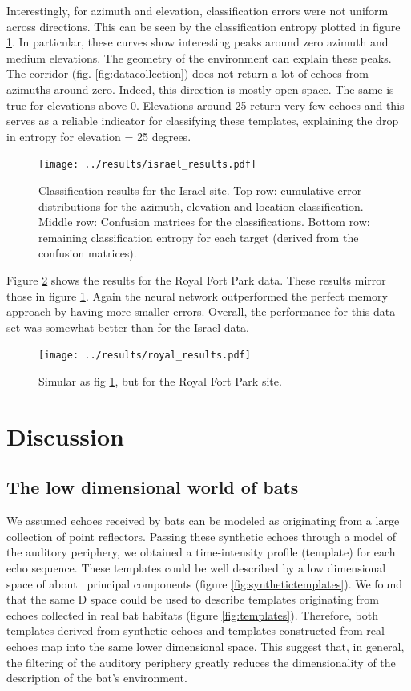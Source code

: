 \documentclass[preprint,5p]{elsarticle}
\begin{document}
Interestingly, for azimuth and elevation, classification errors were not uniform across directions. This can be seen by the classification entropy plotted in figure \ref{fig:israelperformance}. In particular, these curves show interesting peaks around zero azimuth and medium elevations. The geometry of the environment can explain these peaks. The corridor (fig. \ref{fig:datacollection}) does not return a lot of echoes from azimuths around zero. Indeed, this direction is mostly open space. The same is true for elevations above 0. Elevations around 25 return very few echoes and this serves as a reliable indicator for classifying these templates, explaining the drop in entropy for elevation = 25 degrees.

\begin{figure}
	\centering
	\texttt{[image: ../results/israel\_results.pdf]}
	\caption{Classification results for the Israel site. Top row: cumulative error distributions for the azimuth, elevation and location classification. Middle row: Confusion matrices for the classifications. Bottom row: remaining classification entropy for each target (derived from the confusion matrices).}
	\label{fig:israelperformance}
\end{figure}

Figure \ref{fig:royalperformance} shows the results for the Royal Fort Park data. These results mirror those in figure \ref{fig:israelperformance}. Again the neural network outperformed the perfect memory approach by having more smaller errors. Overall, the performance for this data set was somewhat better than for the Israel data.

\begin{figure}
	\centering
	\texttt{[image: ../results/royal\_results.pdf]}
	\caption{Simular as fig \ref{fig:israelperformance}, but for the Royal Fort Park site.}
	\label{fig:royalperformance}
\end{figure}


\section{Discussion}

\subsection{The low dimensional world of bats}

We assumed echoes received by bats can be modeled as originating from a large collection of point reflectors. Passing these synthetic echoes through a model of the auditory periphery, we obtained a time-intensity profile (template) for each echo sequence. These templates could be well described by a low dimensional space of about \pca\ principal components (figure \ref{fig:synthetictemplates}). We found that the same \pca D space could be used to describe templates originating from echoes collected in real bat habitats (figure \ref{fig:templates}). Therefore, both templates derived from synthetic echoes and templates constructed from real echoes map into the same lower dimensional space. This suggest that, in general, the filtering of the auditory periphery greatly reduces the dimensionality of the description of the bat's environment.
\end{document}
